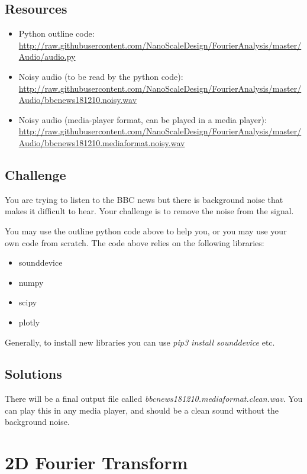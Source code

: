 \subsection*{Resources}
\begin{itemize}
    \item Python outline code: \url{http://raw.githubusercontent.com/NanoScaleDesign/FourierAnalysis/master/Audio/audio.py}
    \item Noisy audio (to be read by the python code): \url{http://raw.githubusercontent.com/NanoScaleDesign/FourierAnalysis/master/Audio/bbcnews181210.noisy.wav}
    \item Noisy audio (media-player format, can be played in a media player): \url{http://raw.githubusercontent.com/NanoScaleDesign/FourierAnalysis/master/Audio/bbcnews181210.mediaformat.noisy.wav}
\end{itemize}

\subsection*{Challenge}
You are trying to listen to the BBC news but there is background noise that makes it difficult to hear. Your challenge is to remove the noise from the signal.

You may use the outline python code above to help you, or you may use your own code from scratch. The code above relies on the following libraries:
\begin{itemize}
    \item sounddevice
    \item numpy
    \item scipy
    \item plotly
\end{itemize}

Generally, to install new libraries you can use \emph{pip3 install sounddevice} etc.

\subsection*{Solutions}
There will be a final output file called \emph{bbcnews181210.mediaformat.clean.wav}.
You can play this in any media player, and should be a clean sound without the background noise.




\newpage
\section{2D Fourier Transform}

